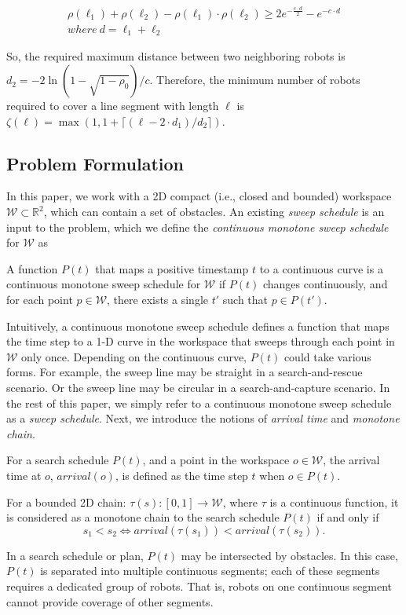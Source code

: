 \begin{align*}
\rho(\ell_1) + \rho(\ell_2) - \rho(\ell_1)\cdot \rho(\ell_2)\geq 2e^{-\frac{c\cdot d}{2}} - e^{-c\cdot d}    \\
where\ d = \ell_1+\ell_2
\end{align*}

So, the required maximum distance between two neighboring robots is $d_2=-2\ln(1-\sqrt{1-\rho_0})/c$.
Therefore, the minimum number of robots required to cover a line segment with length $\ell$ is 
$\zeta(\ell) = \max(1, 1 + \lceil(\ell-2\cdot d_1)/d_2 \rceil )$.


\subsection{Problem Formulation}
In this paper, we work with a 2D compact (i.e., closed and bounded) workspace 
${\mathcal W} \subset \mathbb{R}^2$, which can contain a set of obstacles. 
An existing \emph{sweep schedule} is an input to the problem, which we
define the \emph{continuous monotone sweep schedule} for $\mathcal W$ as 
\begin{definition}
A function $P(t)$ that maps a positive timestamp $t$ to a continuous curve is a continuous monotone sweep schedule for $\mathcal W$ if $P(t)$ changes continuously, 
and for each point $p\in \mathcal W$, there exists a single $t'$ such that $p\in P(t')$.
\end{definition}

Intuitively, a continuous monotone sweep schedule defines a function 
that maps the time step to a 1-D curve in the workspace that sweeps 
through each point in $\mathcal W$ only once. 
%
Depending on the continuous curve, $P(t)$ could take various forms. For example, the sweep line may be straight in a search-and-rescue scenario. Or the sweep line may be circular in a search-and-capture scenario. 
In the rest of this paper, we simply refer to a continuous monotone sweep schedule as a \emph{sweep schedule}. Next, we introduce the notions of \emph{arrival time} and \emph{monotone chain}.
%
\begin{definition}
For a search schedule $P(t)$, and a point in the workspace $o\in\mathcal W$,
the arrival time at $o$, $arrival(o)$, is defined as the time step $t$ when $o\in P(t)$.
\end{definition}

\begin{definition}
For a bounded 2D chain: $\tau(s): [0,1]\rightarrow\mathcal{W}$, where $\tau$ is a continuous function, it is considered as a monotone chain to the search schedule $P(t)$ if and only if
\[s_1 < s_2 \Leftrightarrow arrival(\tau(s_1)) < arrival(\tau(s_2)).\]
\end{definition}
In a search schedule or plan, $P(t)$ may be intersected by obstacles. In this case, $P(t)$ is separated into multiple continuous segments; each of these segments requires a dedicated group of robots. That is, robots on one continuous segment cannot provide coverage of other segments. 

